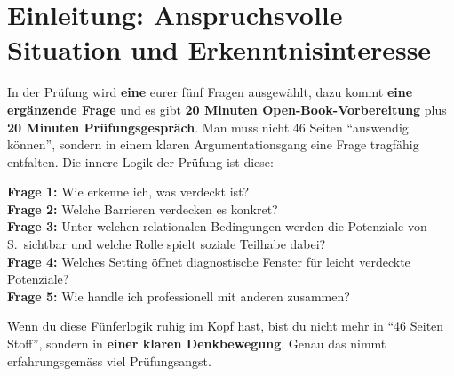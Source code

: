 \documentclass[ngerman, a4paper]{article}
\begin{document}



\newpage
{}
\renewcommand{\thepage}{\arabic{page}}

\section*{Einleitung: Anspruchsvolle Situation und Erkenntnisinteresse}
\label{sec:einleitung}


\begin{kapitelueberblick}
  In der Prüfung wird \textbf{eine} eurer fünf Fragen ausgewählt, dazu kommt
  \textbf{eine ergänzende Frage} und es gibt \textbf{20 Minuten
    Open-Book-Vorbereitung} plus \textbf{20 Minuten Prüfungsgespräch}. Man muss
  nicht 46 Seiten \enquote{auswendig können}, sondern in einem klaren
  Argumentationsgang eine Frage tragfähig entfalten. Die innere Logik der
  Prüfung ist diese:

  \medskip
  \textbf{Frage 1:} Wie erkenne ich, was verdeckt ist?\\
  \textbf{Frage 2:} Welche Barrieren verdecken es konkret?\\
  \textbf{Frage 3:} Unter welchen relationalen Bedingungen werden die Potenziale von S.\ sichtbar und welche Rolle spielt soziale Teilhabe dabei?\\
  \textbf{Frage 4:} Welches Setting öffnet diagnostische Fenster für leicht verdeckte Potenziale?\\
  \textbf{Frage 5:} Wie handle ich professionell mit anderen zusammen?

  \medskip Wenn du diese Fünferlogik ruhig im Kopf hast, bist du nicht mehr in
  \enquote{46 Seiten Stoff}, sondern in \textbf{einer klaren Denkbewegung}.
  Genau das nimmt erfahrungsgemäss viel Prüfungsangst.
\end{kapitelueberblick}
\end{document}
